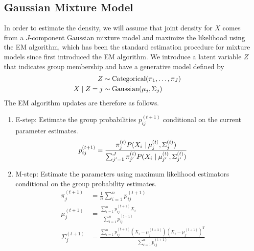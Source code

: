 \documentclass[12pt]{article}
\newcommand*{\cond}{\;\ifnum\currentgrouptype=16 \middle\fi|\;}
\newcommand*{\dist}{\sim}
\newcommand*{\mt}[1]{\text{\normalfont #1}}
\theoremstyle{definition}
\theoremstyle{algodesc}
\begin{document}
\subsection{Gaussian Mixture Model} \label{sec:gmm}
In order to estimate the density, we will assume that joint density for $X$ comes from a $J$-component Gaussian mixture model and maximize the likelihood using the EM algorithm, which has been the standard estimation procedure for mixture models since \citet{dempsterlairdrubin77} first introduced the EM algorithm. We introduce a latent variable $Z$ that indicates group membership and have a generative model defined by
\begin{equation} \label{eq:gmm}
\begin{aligned}
Z &\dist \mt{Categorical}(\pi_1, \dots, \pi_J) \\
X \cond Z = j &\dist \mt{Gaussian}(\mu_j, \Sigma_j)
\end{aligned}
\end{equation}
The EM algorithm updates are therefore as follows.
\begin{enumerate}
\item
  E-step: Estimate the group probabilities $p_{ij}^{(t+1)}$ conditional on the current parameter estimates.
  \begin{equation} \label{eq:gmm_estep}
  p_{ij}^{(t+1)} = \frac{\pi_j^{(t)} P( X_i \cond \mu_j^{(t)}, \Sigma_j^{(t)})}{\sum_{j'=1}^J \pi_{j'}^{(t)} P( X_i \cond \mu_{j'}^{(t)}, \Sigma_{j'}^{(t)})}
  \end{equation}

\item
  M-step: Estimate the parameters using maximum likelihood estimators conditional on the group probability estimates.
  \begin{equation} \label{eq:gmm_mstep}
  \begin{aligned}
  \pi_j^{(t+1)} &= \frac{1}{n} \sum_{i=1}^n p_{ij}^{(t+1)} \\
  \mu_j^{(t+1)} &= \frac{\sum_{i=1}^n p_{ij}^{(t+1)} X_i}{\sum_{i=1}^n p_{ij}^{(t+1)}} \\
  \Sigma_j^{(t+1)} &= \frac{\sum_{i=1}^n p_{ij}^{(t+1)} (X_i - \mu_j^{(t+1)}) (X_i - \mu_j^{(t+1)})^T}{\sum_{i=1}^n p_{ij}^{(t+1)}}
  \end{aligned}
  \end{equation}
\end{enumerate}
\end{document}
